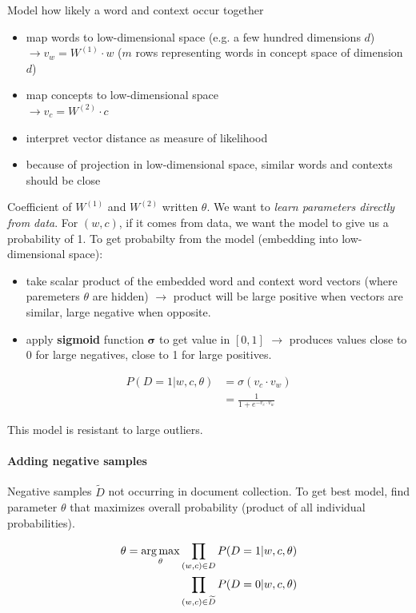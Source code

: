 Model how likely a word and context occur together
\begin{itemize}
  \item map words to low-dimensional space (e.g. a few hundred dimensions $d$)\\
  $\rightarrow v_w = W^{(1)} \cdot w$ ($m$ rows representing words in concept space of dimension $d$)
  \item map concepts to low-dimensional space \\
  $\rightarrow v_c = W^{(2)}\cdot c$
  \item interpret vector distance as measure of likelihood
  \item because of projection in low-dimensional space, similar words and contexts should be close
\end{itemize}

Coefficient of $W^{(1)}$ and $W^{(2)}$ written $\theta$. We want to \emph{learn parameters directly from data}. For $(w,c)$, if it comes from data, we want the model to give us a probability of 1. To get probabilty from the model (embedding into low-dimensional space):
\begin{itemize}
  \item take scalar product of the embedded word and context word vectors (where paremeters $\theta$ are hidden) $\longrightarrow$ product will be large positive when vectors are similar, large negative when opposite.
  \item apply \textbf{sigmoid} function $\mathbf{\sigma}$ to get value in $[0, 1]$ $\longrightarrow$ produces values close to 0 for large negatives, close to 1 for large positives.
\end{itemize}

\begin{align*}
  P(D = 1 | w, c, \theta) &= \sigma(v_c \cdot v_w) \\
  &= \frac{1}{1 + e^{-v_c\cdot v_w}}
\end{align*}

This model is resistant to large outliers.

\paragraph{Adding negative samples} Negative samples $\widetilde{D}$ not occurring in document collection. To get best model, find parameter $\theta$ that maximizes overall probability (product of all individual probabilities).

\begin{align*}
  \theta = \operatorname*{arg\,max}_{\theta} \prod_{(w,c) \in D} P(D = 1 | w, c, \theta) \\
  \prod_{(w,c) \in \widetilde{D}} P(D = 0 | w, c, \theta)
\end{align*}

